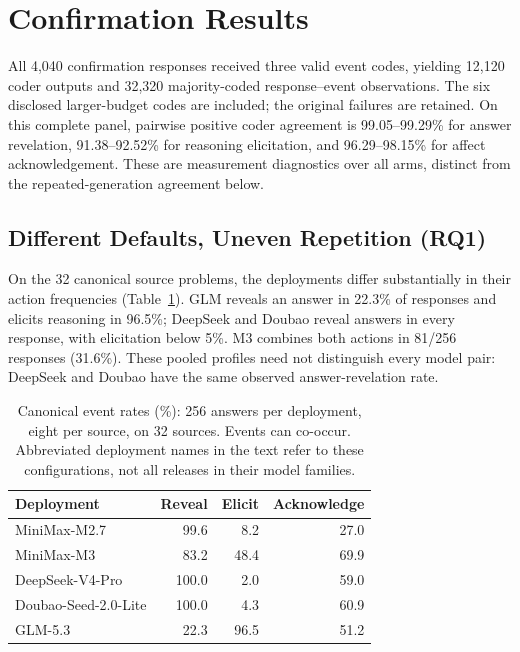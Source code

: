\section{Confirmation Results}
\label{sec:results}

All 4,040 confirmation responses received three valid event codes, yielding
12,120 coder outputs and 32,320 majority-coded response--event observations.
The six disclosed larger-budget codes are included; the original failures are
retained. On this complete panel, pairwise positive coder agreement is
99.05--99.29\% for answer revelation, 91.38--92.52\% for reasoning elicitation,
and 96.29--98.15\% for affect acknowledgement. These are measurement diagnostics
over all arms, distinct from the repeated-generation agreement below.

\subsection{Different Defaults, Uneven Repetition (RQ1)}

On the 32 canonical source problems, the deployments differ substantially in
their action frequencies (Table~\ref{tab:default-rates}). GLM reveals an answer
in 22.3\% of responses and elicits reasoning in 96.5\%; DeepSeek and Doubao
reveal answers in every response, with elicitation below 5\%. M3 combines
both actions in 81/256 responses (31.6\%). These pooled profiles need not distinguish every
model pair: DeepSeek and Doubao have the same observed answer-revelation rate.

\begin{table}[t]
\centering\small
\begin{tabular}{lrrr}
\toprule
Deployment & Reveal & Elicit & Acknowledge \\
\midrule
MiniMax-M2.7 & 99.6 & 8.2 & 27.0 \\
MiniMax-M3 & 83.2 & 48.4 & 69.9 \\
DeepSeek-V4-Pro & 100.0 & 2.0 & 59.0 \\
Doubao-Seed-2.0-Lite & 100.0 & 4.3 & 60.9 \\
GLM-5.3 & 22.3 & 96.5 & 51.2 \\
\bottomrule
\end{tabular}
\caption{Canonical event rates (\%): 256 answers per deployment, eight per
source, on 32 sources. Events can co-occur. Abbreviated deployment names in the
text refer to these configurations, not all releases in their model families.}
\label{tab:default-rates}
\end{table}

